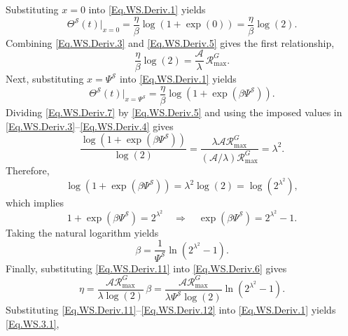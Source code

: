 Substituting $x=0$ into \eqref{Eq.WS.Deriv.1} yields
\begin{equation} \label{Eq.WS.Deriv.5}
\Theta^{\mathcal{S}}(t)\Big|_{x=0}
=
\frac{\eta}{\beta}\log(1+\exp(0))
=
\frac{\eta}{\beta}\log(2).
\end{equation}
\noindent Combining \eqref{Eq.WS.Deriv.3} and \eqref{Eq.WS.Deriv.5} gives the first relationship,
\begin{equation} \label{Eq.WS.Deriv.6}
\frac{\eta}{\beta}\log(2)=\frac{\mathcal{A}}{\lambda}\,\mathcal{R}^{G}_{\max}.
\end{equation}
Next, substituting $x=\Psi^{\mathcal{S}}$ into \eqref{Eq.WS.Deriv.1} yields
\begin{equation} \label{Eq.WS.Deriv.7}
\Theta^{\mathcal{S}}(t)\Big|_{x=\Psi^{\mathcal{S}}}
=
\frac{\eta}{\beta}\log\!\left(1+\exp\!\left(\beta\Psi^{\mathcal{S}}\right)\right).
\end{equation}
Dividing \eqref{Eq.WS.Deriv.7} by \eqref{Eq.WS.Deriv.5} and using the imposed values in
\eqref{Eq.WS.Deriv.3}--\eqref{Eq.WS.Deriv.4} gives
\begin{equation} \label{Eq.WS.Deriv.8}
\frac{\log\!\left(1+\exp\!\left(\beta\Psi^{\mathcal{S}}\right)\right)}{\log(2)}
=
\frac{\lambda\mathcal{A}\mathcal{R}^{G}_{\max}}{(\mathcal{A}/\lambda)\mathcal{R}^{G}_{\max}}
=
\lambda^{2}.
\end{equation}
\noindent Therefore,
\begin{equation} \label{Eq.WS.Deriv.9}
\log\!\left(1+\exp\!\left(\beta\Psi^{\mathcal{S}}\right)\right)=\lambda^{2}\log(2)=\log\!\left(2^{\lambda^{2}}\right),
\end{equation}
which implies
\begin{equation} \label{Eq.WS.Deriv.10}
1+\exp\!\left(\beta\Psi^{\mathcal{S}}\right)=2^{\lambda^{2}}
\quad \Rightarrow \quad
\exp\!\left(\beta\Psi^{\mathcal{S}}\right)=2^{\lambda^{2}}-1.
\end{equation}
\noindent Taking the natural logarithm yields
\begin{equation} \label{Eq.WS.Deriv.11}
\beta=\frac{1}{\Psi^{\mathcal{S}}}\ln\!\left(2^{\lambda^{2}}-1\right).
\end{equation}
Finally, substituting \eqref{Eq.WS.Deriv.11} into \eqref{Eq.WS.Deriv.6} gives
\begin{equation} \label{Eq.WS.Deriv.12}
\eta
=
\frac{\mathcal{A}\mathcal{R}^{G}_{\max}}{\lambda\log(2)}\,\beta
=
\frac{\mathcal{A}\mathcal{R}^{G}_{\max}}{\lambda\Psi^{\mathcal{S}}\log(2)}
\ln\!\left(2^{\lambda^{2}}-1\right).
\end{equation}
Substituting \eqref{Eq.WS.Deriv.11}--\eqref{Eq.WS.Deriv.12} into \eqref{Eq.WS.Deriv.1} yields \eqref{Eq.WS.3.1},

